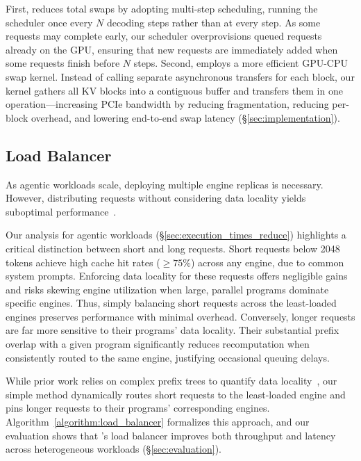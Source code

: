 First, \text{\name} reduces total swaps by adopting multi-step scheduling, running the scheduler once every $N$ decoding steps rather than at every step. As some requests may complete early, our scheduler overprovisions queued requests already on the GPU, ensuring that new requests are immediately added when some requests finish before $N$ steps. Second, \text{\name} employs a more efficient GPU-CPU swap kernel. Instead of calling separate asynchronous transfers for each block, our kernel gathers all KV blocks into a contiguous buffer and transfers them in one operation—increasing PCIe bandwidth by reducing fragmentation, reducing per-block overhead, and lowering end-to-end swap latency (\S\ref{sec:implementation}).


\subsection{Load Balancer}
\label{sec:load_balancer}

As agentic workloads scale, deploying multiple engine replicas is necessary. However, distributing requests without considering data locality yields suboptimal performance~\cite{preble}.

Our analysis for agentic workloads (§\ref{sec:execution_times_reduce}) highlights a critical distinction between short and long requests. Short requests below 2048 tokens achieve high cache hit rates ($\geq75\%$) across any engine, due to common system prompts. Enforcing data locality for these requests offers negligible gains and risks skewing engine utilization when large, parallel programs dominate specific engines. Thus, simply balancing short requests across the least-loaded engines preserves performance with minimal overhead. Conversely, longer requests are far more sensitive to their programs' data locality. Their substantial prefix overlap with a given program significantly reduces recomputation when consistently routed to the same engine, justifying occasional queuing delays.

While prior work relies on complex prefix trees to quantify data locality~\cite{preble}, our simple method dynamically routes short requests to the least-loaded engine and pins longer requests to their programs’ corresponding engines. Algorithm~\ref{algorithm:load_balancer} formalizes this approach, and our evaluation shows that \text{\name}’s load balancer improves both throughput and latency across heterogeneous workloads (\S\ref{sec:evaluation}).


